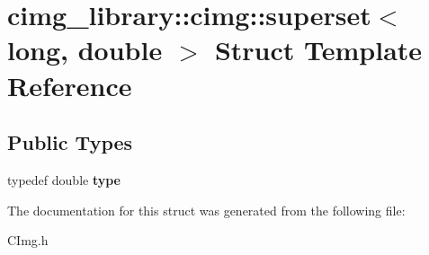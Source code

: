\hypertarget{structcimg__library_1_1cimg_1_1superset_3_01long_00_01double_01_4}{\section{cimg\-\_\-library\-:\-:cimg\-:\-:superset$<$ long, double $>$ Struct Template Reference}
\label{structcimg__library_1_1cimg_1_1superset_3_01long_00_01double_01_4}
}
\subsection*{Public Types}
\begin{DoxyCompactItemize}
\item 
\hypertarget{structcimg__library_1_1cimg_1_1superset_3_01long_00_01double_01_4_ab5d694cc85b88cc5ba4f85168b83406a}{typedef double {\bfseries type}}\label{structcimg__library_1_1cimg_1_1superset_3_01long_00_01double_01_4_ab5d694cc85b88cc5ba4f85168b83406a}

\end{DoxyCompactItemize}


The documentation for this struct was generated from the following file\-:\begin{DoxyCompactItemize}
\item 
C\-Img.\-h\end{DoxyCompactItemize}
